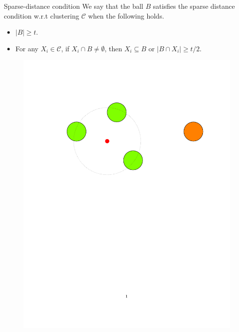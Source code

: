 \documentclass{beamer}
\newcommand{\mc}{\mathcal}
\begin{document}
\begin{frame}{Sparse-distance condition}
    We say that the ball $B$ satisfies the sparse distance condition w.r.t clustering $\mc C$ when the following holds.
	\begin{itemize}
	  \item $|B| \ge t$.
	  \item For any $X_i \in \mc C$, if $X_i \cap B \neq \emptyset$, then $X_i \subseteq B$ or $|B \cap X_i| \ge t/2$.
	\end{itemize}

   \begin{figure}
	  \includegraphics[trim = 100 0 0 100, clip, width=\linewidth]{3.pdf}
   \end{figure}
\end{frame}
\end{document}
